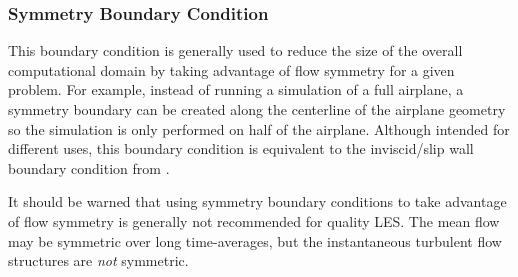 \subsubsection{Symmetry Boundary Condition}
\label{SEC:BC:Numerical:Symmetry}

This boundary condition is generally used to reduce the size of the overall
computational domain by taking advantage of flow symmetry for a given problem.
%
For example, instead of running a simulation of a full airplane, a symmetry
boundary can be created along the centerline of the airplane geometry so the
simulation is only performed on half of the airplane.
%
Although intended for different uses, this boundary condition is equivalent to
the inviscid\slash slip wall boundary condition from .


\NOTE It should be warned that using symmetry boundary conditions to take
advantage of flow symmetry is generally not recommended for quality LES.
%
The mean flow may be symmetric over long time-averages, but the instantaneous
turbulent flow structures are \emph{not} symmetric.


